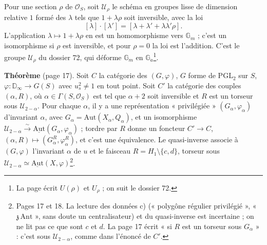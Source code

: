 \documentclass[11pt,a4paper]{article}
\begin{document}
Pour une section $\rho$ de $\mathcal{O}_S$, soit $\mathcal{U}_\rho$ le schéma
en groupes lisse de dimension relative $1$ formé des $\lambda$ tels que $1 +
\lambda\rho$ soit inversible, avec la loi
\[
  [\lambda] \cdot [\lambda'] = [\lambda + \lambda' + \lambda\lambda'\rho] .
\]
L'application $\lambda \mapsto 1 + \lambda\rho$ en est un homomorphisme vers
$\mathbb{G}_m$ ; c'est un isomorphisme si $\rho$ est inversible, et pour
$\rho = 0$ la loi est l'addition. C'est le groupe $\mathcal{U}_\rho$ du dossier
72, qui déforme $\mathbb{G}_m$ en $\mathbb{G}_a$\footnote{La page écrit
$U(\rho)$ et $U_\rho$ ; on suit le dossier 72.}.

\textbf{Théorème} (page 17). Soit $C$ la catégorie des $(G, \varphi)$, $G$
forme de $\mathrm{PGL}_2$ sur $S$, $\varphi : \mathbb{D}_\infty \to G(S)$ avec
$u_s^2 \neq 1$ en tout point. Soit $C'$ la catégorie des couples $(\alpha,
R)$, où $\alpha \in \Gamma(S, \mathcal{O}_S)$ est tel que $\alpha + 2$ soit
inversible et $R$ est un torseur sous $\mathcal{U}_{2-\alpha}$. Pour chaque
$\alpha$, il y a une représentation « privilégiée » $(G_\alpha,
\varphi_\alpha)$ d'invariant $\alpha$, avec $G_\alpha = \mathrm{Aut}(X_\alpha,
Q_\alpha)$, et un isomorphisme $\mathcal{U}_{2-\alpha} \xrightarrow{\sim}
\underline{\mathrm{Aut}}(G_\alpha, \varphi_\alpha)$ ; tordre par $R$ donne un
foncteur $C' \to C$, $(\alpha, R) \mapsto (G_\alpha^R, \varphi_\alpha^R)$, et
c'est une équivalence. Le quasi-inverse associe à $(G, \varphi)$ l'invariant
$\alpha$ de $u$ et le faisceau $R = H_1 \setminus \{c, d\}$, torseur sous
$\mathcal{U}_{2-\alpha} \simeq \underline{\mathrm{Aut}}(X, \varphi)$\footnote{Pages
17 et 18. La lecture des données c) (« polygône régulier privilégié »,
« $\mathfrak{z}\,\mathrm{Ant}$ », sans doute un centralisateur) et du
quasi-inverse est incertaine ; on ne lit pas ce que sont $c$ et $d$. La page
17 écrit « si $R$ est un torseur sous $G_\alpha$ » : c'est sous
$\mathcal{U}_{2-\alpha}$, comme dans l'énoncé de $C'$.}.
\end{document}
